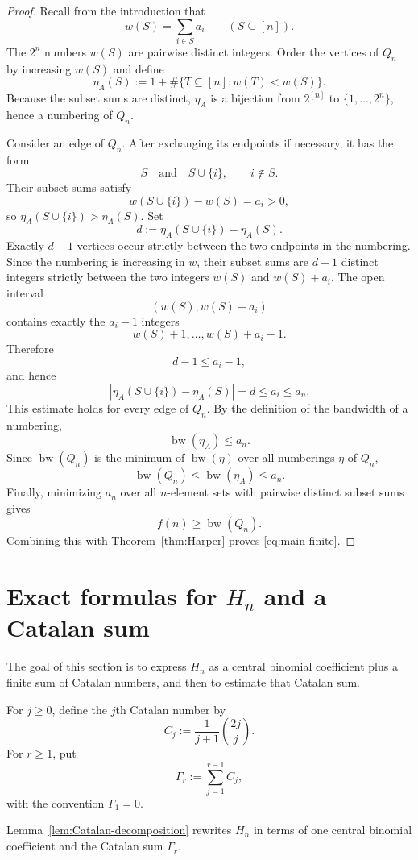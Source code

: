 \documentclass[10pt]{amsart}
\numberwithin{equation}{section}
\newcommand{\bw}{\operatorname{bw}}
\begin{document}
\begin{proof}
Recall from the introduction that
\[
 w(S)=\sum_{i\in S}a_i\qquad(S\subseteq[n]).
\]
The $2^n$ numbers $w(S)$ are pairwise distinct integers.  Order the vertices
of $Q_n$ by increasing $w(S)$ and define
\[
 \eta_A(S):=1+\#\{T\subseteq[n]:w(T)<w(S)\}.
\]
Because the subset sums are distinct, $\eta_A$ is a bijection from
$2^{[n]}$ to $\{1,\ldots,2^n\}$, hence a numbering of $Q_n$.

Consider an edge of $Q_n$.  After exchanging its endpoints if necessary, it
has the form
\[
 S\quad\text{and}\quad S\cup\{i\},
 \qquad i\notin S.
\]
Their subset sums satisfy
\[
 w(S\cup\{i\})-w(S)=a_i>0,
\]
so $\eta_A(S\cup\{i\})>\eta_A(S)$.  Set
\[
 d:=\eta_A(S\cup\{i\})-\eta_A(S).
\]
Exactly $d-1$ vertices occur strictly between the two endpoints in the
numbering.  Since the numbering is increasing in $w$, their subset sums are
$d-1$ distinct integers strictly between the two integers $w(S)$ and
$w(S)+a_i$.  The open interval
\[
 (w(S),w(S)+a_i)
\]
contains exactly the $a_i-1$ integers
\[
 w(S)+1,\ldots,w(S)+a_i-1.
\]
Therefore
\[
 d-1\le a_i-1,
\]
and hence
\[
 |\eta_A(S\cup\{i\})-\eta_A(S)|=d\le a_i\le a_n.
\]
This estimate holds for every edge of $Q_n$.  By the definition of the
bandwidth of a numbering,
\[
 \bw(\eta_A)\le a_n.
\]
Since $\bw(Q_n)$ is the minimum of $\bw(\eta)$ over all numberings $\eta$ of
$Q_n$,
\[
 \bw(Q_n)\le \bw(\eta_A)\le a_n.
\]
Finally, minimizing $a_n$ over all $n$-element sets with pairwise distinct
subset sums gives
\[
 f(n)\ge\bw(Q_n).
\]
Combining this with Theorem~\ref{thm:Harper} proves \cref{eq:main-finite}.
\end{proof}

\section{Exact formulas for \texorpdfstring{$H_n$}{H n} and a Catalan sum}\label{sec:catalan}

The goal of this section is to express $H_n$ as a central binomial coefficient
plus a finite sum of Catalan numbers, and then to estimate that Catalan sum.

For $j\ge0$, define the $j$th Catalan number by
\[
 C_j:=\frac{1}{j+1}\binom{2j}{j}.
\]
For $r\ge1$, put
\[
 \Gamma_r:=\sum_{j=1}^{r-1}C_j,
\]
with the convention $\Gamma_1=0$.

Lemma~\ref{lem:Catalan-decomposition} rewrites $H_n$ in terms of one central
binomial coefficient and the Catalan sum $\Gamma_r$.
\end{document}
